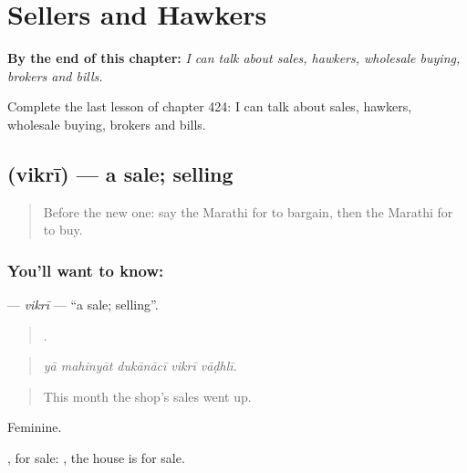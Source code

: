 
\chapter{Sellers and Hawkers}
\label{ch:mr-sellers-and-hawkers}

\begin{chapteropening}
\textbf{By the end of this chapter:} \emph{I can talk about sales, hawkers, wholesale buying, brokers and bills.}

Complete the last lesson of chapter 424: I can talk about sales, hawkers, wholesale buying, brokers and bills.
\end{chapteropening}

\section[\texorpdfstring{\mr{विक्री} (vikrī)}{विक्री (vikrī)}]{ (vikrī) — a sale; selling}

\label{lesson:MR-C424-vikri}



\begin{quote}
Before the new one: say the Marathi for to bargain, then the Marathi for to buy.
\end{quote}

\subsection*{You'll want to know: }
\textbf{} — \emph{vikrī} — \textquotedblleft{}a sale; selling\textquotedblright{}.

\begin{quote}
    .
\end{quote}

\begin{quote}
\emph{yā mahinyāt dukānācī vikrī vāḍhlī.}
\end{quote}

\begin{quote}
This month the shop’s sales went up.
\end{quote}

Feminine.

, for sale:   , the house is for sale.

